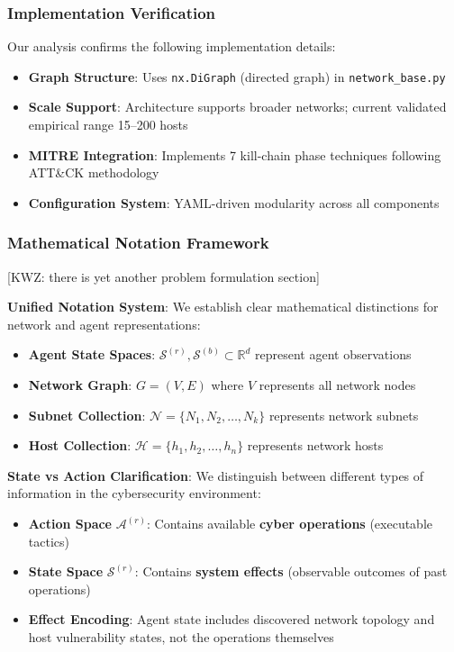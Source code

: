\documentclass[12pt,oneside]{article}
\newcommand{\kwz}[1]{
  {\color{magenta} [KWZ: {#1}]}
 }
\begin{document}
\subsubsection{Implementation Verification}
Our analysis confirms the following implementation details:
\begin{itemize}
    \item \textbf{Graph Structure}: Uses \texttt{nx.DiGraph} (directed graph) in \texttt{network\_base.py}
    \item \textbf{Scale Support}: Architecture supports broader networks; current validated empirical range 15--200 hosts
    \item \textbf{MITRE Integration}: Implements 7 kill-chain phase techniques following ATT\&CK methodology
    \item \textbf{Configuration System}: YAML-driven modularity across all components
\end{itemize}

\subsubsection{Mathematical Notation Framework}

\kwz{there is yet another problem formulation section}

\textbf{Unified Notation System}: We establish clear mathematical distinctions for network and agent representations:

\begin{itemize}
\item \textbf{Agent State Spaces}: $\mathcal{S}^{(r)}, \mathcal{S}^{(b)} \subset \mathbb{R}^{d}$ represent agent observations
\item \textbf{Network Graph}: $G = (V, E)$ where $V$ represents all network nodes  
\item \textbf{Subnet Collection}: $\mathcal{N} = \{N_1, N_2, \ldots, N_k\}$ represents network subnets
\item \textbf{Host Collection}: $\mathcal{H} = \{h_1, h_2, \ldots, h_n\}$ represents network hosts
\end{itemize}

\textbf{State vs Action Clarification}: We distinguish between different types of information in the cybersecurity environment:
\begin{itemize}
\item \textbf{Action Space} $\mathcal{A}^{(r)}$: Contains available \textbf{cyber operations} (executable tactics)
\item \textbf{State Space} $\mathcal{S}^{(r)}$: Contains \textbf{system effects} (observable outcomes of past operations)  
\item \textbf{Effect Encoding}: Agent state includes discovered network topology and host vulnerability states, not the operations themselves
\end{itemize}
\end{document}
